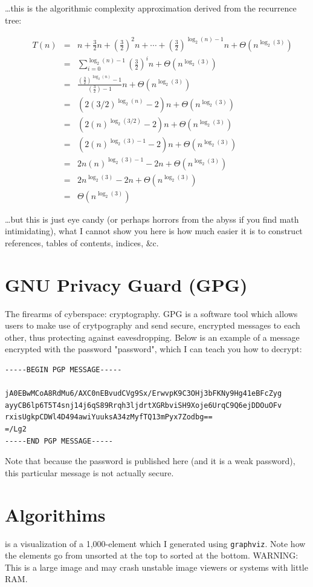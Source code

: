 \documentclass{article}
\begin{document}
\ldots this is the algorithmic complexity approximation derived from the recurrence tree:
\begin{figure} %
\begin{eqnarray*}
	T(n) &=& n + \frac{3}{2}n + \left(\frac{3}{2}\right)^2n + \cdots + \left(\frac{3}{2}\right)^{\log_2(n) - 1}n + \Theta(n^{\log_2(3)}) \\
	&=& \sum_{i=0}^{\log_2(n)-1} \left(\frac{3}{2}\right)^in + \Theta(n^{\log_2(3)}) \\
	&=& \frac{\left(\frac{3}{2}\right)^{\log_2(n)} - 1}{\left(\frac{3}{2}\right) - 1}n + \Theta(n^{\log_2(3)}) \\
	&=& (2(3/2)^{\log_2(n)} - 2)n + \Theta(n^{\log_2(3)}) \\
	&=& (2(n)^{\log_2(3/2)} - 2)n + \Theta(n^{\log_2(3)}) \\
	&=& (2(n)^{\log_2(3) - 1} - 2)n + \Theta(n^{\log_2(3)}) \\
	&=& 2n(n)^{\log_2(3) - 1} - 2n + \Theta(n^{\log_2(3)}) \\
	&=& 2n^{\log_2(3)} - 2n + \Theta(n^{\log_2(3)}) \\
	&=& \Theta(n^{\log_2(3)})
\end{eqnarray*}
\end{figure}
\ldots but this is just eye candy (or perhaps horrors from the abyss if you find math intimidating), what I cannot show you here is how much easier it is to construct references, tables of contents, indices, \&c.

\section{GNU Privacy Guard (GPG)}
The firearms of cyberspace: cryptography.  GPG is a software tool which allows users to make use of crytpography and send secure, encrypted messages to each other, thus protecting against eavesdropping.  Below is an example of a message encrypted with the password "password", which I can teach you how to decrypt:
\begin{verbatim}
-----BEGIN PGP MESSAGE-----

jA0EBwMCoA8RdMu6/AXC0nEBvudCVg9Sx/ErwvpK9C3OHj3bFKNy9Hg41eBFcZyg
ayyCB6lp6T5T4snj14j6qS89Rrqh3ljdrtXGRbviSH9Xoje6UrqC9Q6ejDDOuOFv
rxisUgkpCDWl4D494awiYuuksA34zMyfTQ13mPyx7Zodbg==
=/Lg2
-----END PGP MESSAGE-----
\end{verbatim}
Note that because the password is published here (and it is a weak password), this particular message is not actually secure.

\section{Algorithims}
 is a visualization of a 1,000-element  which I generated using \texttt{graphviz}.  Note how the elements go from unsorted at the top to sorted at the bottom.  WARNING: This is a large image and may crash unstable image viewers or systems with little RAM.
\end{document}
